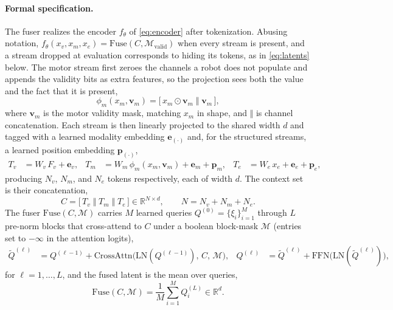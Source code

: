 \documentclass{article}
\begin{document}
\paragraph{Formal specification.} The fuser realizes the encoder $f_\theta$ of \eqref{eq:encoder} after tokenization. Abusing notation, $f_\theta(x_v, x_m, x_e) = \mathrm{Fuse}(C, \mathcal{M}_{\mathrm{valid}})$ when every stream is present, and a stream dropped at evaluation corresponds to hiding its tokens, as in \eqref{eq:latents} below. The motor stream first zeroes the channels a robot does not populate and appends the validity bits as extra features, so the projection sees both the value and the fact that it is present,
\begin{equation}
  \label{eq:motorfeat}
  \phi_m(x_m, \mathbf{v}_m) = \big[\, x_m \odot \mathbf{v}_m \;\Vert\; \mathbf{v}_m \,\big],
\end{equation}
where $\mathbf{v}_m$ is the motor validity mask, matching $x_m$ in shape, and $\Vert$ is channel concatenation. Each stream is then linearly projected to the shared width $d$ and tagged with a learned modality embedding $\mathbf{e}_{(\cdot)}$ and, for the structured streams, a learned position embedding $\mathbf{p}_{(\cdot)}$,
\begin{align}
  \label{eq:proj}
  T_v &= W_v\, F_v + \mathbf{e}_v, &
  T_m &= W_m\, \phi_m(x_m,\mathbf{v}_m) + \mathbf{e}_m + \mathbf{p}_m, &
  T_e &= W_e\, x_e + \mathbf{e}_e + \mathbf{p}_e,
\end{align}
producing $N_v$, $N_m$, and $N_e$ tokens respectively, each of width $d$. The context set is their concatenation,
\begin{equation}
  \label{eq:context}
  C = \big[\, T_v \;\Vert\; T_m \;\Vert\; T_e \,\big] \in \mathbb{R}^{N\times d}, \qquad N = N_v + N_m + N_e.
\end{equation}
The fuser $\mathrm{Fuse}(C, \mathcal{M})$ carries $M$ learned queries $Q^{(0)}=\{\xi_i\}_{i=1}^{M}$ through $L$ pre-norm blocks that cross-attend to $C$ under a boolean block-mask $\mathcal{M}$ (entries set to $-\infty$ in the attention logits),
\begin{align}
  \label{eq:fuse}
  \tilde Q^{(\ell)} &= Q^{(\ell-1)} + \mathrm{CrossAttn}\big(\mathrm{LN}(Q^{(\ell-1)}),\, C,\, \mathcal{M}\big), &
  Q^{(\ell)} &= \tilde Q^{(\ell)} + \mathrm{FFN}\big(\mathrm{LN}(\tilde Q^{(\ell)})\big),
\end{align}
for $\ell = 1,\dots,L$, and the fused latent is the mean over queries,
\begin{equation}
  \label{eq:pool}
  \mathrm{Fuse}(C,\mathcal{M}) = \frac{1}{M}\sum_{i=1}^{M} Q^{(L)}_i \in \mathbb{R}^{d}.
\end{equation}
\end{document}
